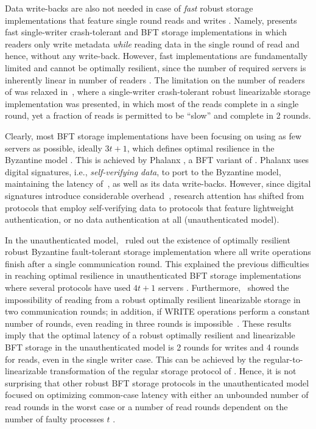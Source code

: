 \documentclass[10pt,conference,compsocconf]{IEEEtran}
\begin{document}
Data write-backs are also not needed in case of \emph{fast} robust storage implementations that feature single round reads and writes \cite{DGLV10}. Namely, \cite{DGLV10} presents fast single-writer crash-tolerant and BFT storage implementations in which readers only write metadata \emph{while} reading data in the single round of read and hence, without any write-back. However, fast implementations are fundamentally limited and cannot be optimally resilient, since the number of required servers is inherently linear in number of readers \cite{DGLV10}. The limitation on the number of readers of \cite{DGLV10} was relaxed in~\cite{GNS09}, where a single-writer crash-tolerant robust linearizable storage implementation was presented, in which most of the reads complete in a single round, yet a fraction of reads is permitted to be ``slow'' and complete in 2 rounds.

Clearly, most BFT storage implementations have been focusing on using as few servers as possible, ideally $3t+1$, which defines optimal resilience in the Byzantine model \cite{MAD02}. This is achieved by Phalanx \cite{Phalanx}, a BFT variant of \cite{ABND95}. Phalanx uses digital signatures, i.e., \emph{self-verifying data}, to port \cite{ABND95} to the Byzantine model, maintaining the latency of~\cite{ABND95}, as well as its data write-backs. However, since digital signatures introduce considerable overhead~\cite{Rei94,MR97}, research attention has shifted from protocols that employ self-verifying data \cite{Phalanx, MR98, CT06, LR06} to protocols that feature lightweight authentication, or no data authentication at all (unauthenticated model).

In the unauthenticated model,~\cite{ACKM06} ruled out the existence of optimally resilient robust Byzantine fault-tolerant storage implementation where all write operations finish after a single communication round. This explained the previous difficulties in reaching optimal resilience in unauthenticated BFT storage implementations where several protocols have used $4t+1$ servers \cite{GWGR04,BD04}. Furthermore,~\cite{DGM11} showed the impossibility of reading from a robust optimally resilient linearizable storage in two communication rounds; in addition, if \textsc{WRITE} operations perform a constant number of rounds, even reading in three rounds is impossible~\cite{DGM11}. These results imply that the optimal latency of a robust optimally resilient and linearizable BFT storage in the unauthenticated model is 2 rounds for writes and 4 rounds for reads, even in the single writer case. This can be achieved by the regular-to-linearizable transformation of the regular \cite{Lam86} storage protocol of \cite{GV06}. Hence, it is not surprising that other robust BFT storage protocols in the unauthenticated model focused on optimizing common-case latency with either an unbounded number of read rounds in the worst case \cite{GLV06,GV10} or a number of read rounds dependent on the number of faulty processes $t$ \cite{MAD02,AAB07}.
\end{document}
